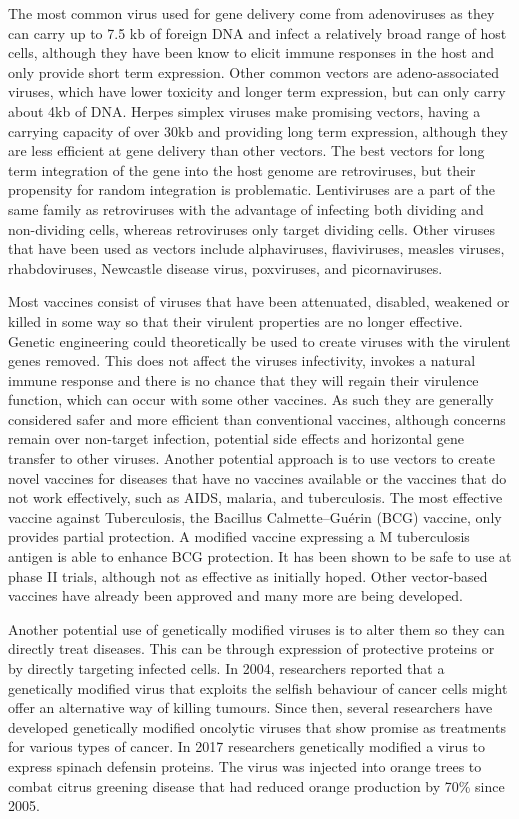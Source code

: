 The most common virus used for gene delivery come from adenoviruses as they can carry up to 7.5 kb of foreign DNA and infect a relatively broad range of host cells, although they have been know to elicit immune responses in the host and only provide short term expression. Other common vectors are adeno-associated viruses, which have lower toxicity and longer term expression, but can only carry about 4kb of DNA. Herpes simplex viruses make promising vectors, having a carrying capacity of over 30kb and providing long term expression, although they are less efficient at gene delivery than other vectors. The best vectors for long term integration of the gene into the host genome are retroviruses, but their propensity for random integration is problematic. Lentiviruses are a part of the same family as retroviruses with the advantage of infecting both dividing and non-dividing cells, whereas retroviruses only target dividing cells. Other viruses that have been used as vectors include alphaviruses, flaviviruses, measles viruses, rhabdoviruses, Newcastle disease virus, poxviruses, and picornaviruses.

Most vaccines consist of viruses that have been attenuated, disabled, weakened or killed in some way so that their virulent properties are no longer effective. Genetic engineering could theoretically be used to create viruses with the virulent genes removed. This does not affect the viruses infectivity, invokes a natural immune response and there is no chance that they will regain their virulence function, which can occur with some other vaccines. As such they are generally considered safer and more efficient than conventional vaccines, although concerns remain over non-target infection, potential side effects and horizontal gene transfer to other viruses. Another potential approach is to use vectors to create novel vaccines for diseases that have no vaccines available or the vaccines that do not work effectively, such as AIDS, malaria, and tuberculosis. The most effective vaccine against Tuberculosis, the Bacillus Calmette--Guérin (BCG) vaccine, only provides partial protection. A modified vaccine expressing a M tuberculosis antigen is able to enhance BCG protection. It has been shown to be safe to use at phase II trials, although not as effective as initially hoped. Other vector-based vaccines have already been approved and many more are being developed.

Another potential use of genetically modified viruses is to alter them so they can directly treat diseases. This can be through expression of protective proteins or by directly targeting infected cells. In 2004, researchers reported that a genetically modified virus that exploits the selfish behaviour of cancer cells might offer an alternative way of killing tumours. Since then, several researchers have developed genetically modified oncolytic viruses that show promise as treatments for various types of cancer. In 2017 researchers genetically modified a virus to express spinach defensin proteins. The virus was injected into orange trees to combat citrus greening disease that had reduced orange production by 70\% since 2005.

